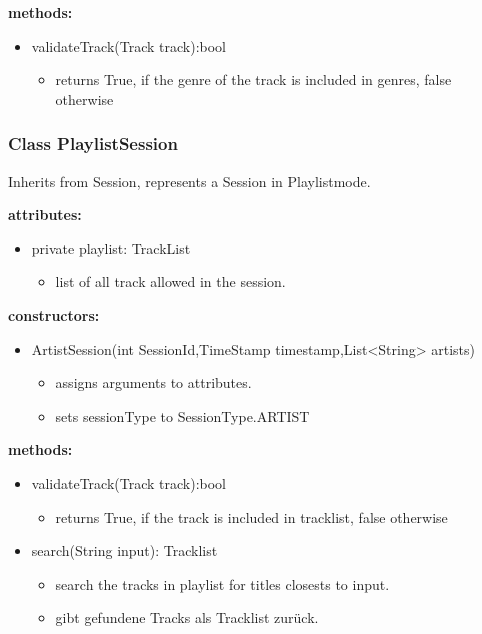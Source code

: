 \documentclass[oneside, nenglish]{sdqtechreport}
\begin{document}
\textbf{methods:}
\begin{itemize}
    \item validateTrack(Track track):bool
    \begin{itemize}
        \item returns True, if the genre of the track is included in genres, false otherwise
    \end{itemize}
\end{itemize}

\subsubsection{Class PlaylistSession}
Inherits from Session, represents a Session in Playlistmode.

\textbf{attributes:}
\begin{itemize}
    \item private playlist: TrackList
    \begin{itemize}
        \item list of all track allowed in the session.
    \end{itemize}
\end{itemize}
\textbf{constructors:}
\begin{itemize}
    \item ArtistSession(int SessionId,TimeStamp timestamp,List<String> artists)
    \begin{itemize}
        \item assigns arguments to attributes.
        \item sets sessionType to SessionType.ARTIST
    \end{itemize}
\end{itemize}

\textbf{methods:}
\begin{itemize}
    \item validateTrack(Track track):bool
    \begin{itemize}
        \item returns True, if the track is included in tracklist, false otherwise
    \end{itemize}
    \item search(String input): Tracklist
    \begin{itemize}
        \item search the tracks in playlist for titles closests to input.
        \item gibt gefundene Tracks als Tracklist zurück.
    \end{itemize}
\end{itemize}
\end{document}

